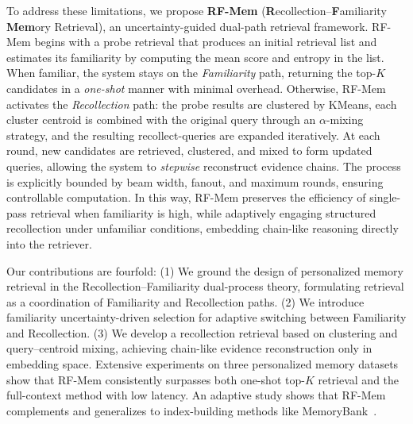 To address these limitations, we propose \textbf{RF-Mem} (\textbf{R}ecollection–\textbf{F}amiliarity \textbf{Mem}ory Retrieval), an uncertainty-guided dual-path retrieval framework. RF-Mem begins with a probe retrieval that produces an initial retrieval list and estimates its familiarity by computing the mean score and entropy in the list. When familiar, the system stays on the \emph{Familiarity} path, returning the top-$K$ candidates in a \textit{one-shot} manner with minimal overhead. Otherwise, RF-Mem activates the \emph{Recollection} path: the probe results are clustered by KMeans, each cluster centroid is combined with the original query through an $\alpha$-mixing strategy, and the resulting recollect-queries are expanded iteratively. At each round, new candidates are retrieved, clustered, and mixed to form updated queries, allowing the system to \textit{stepwise} reconstruct evidence chains. The process is explicitly bounded by beam width, fanout, and maximum rounds, ensuring controllable computation. In this way, RF-Mem preserves the efficiency of single-pass retrieval when familiarity is high, while adaptively engaging structured recollection under unfamiliar conditions, embedding chain-like reasoning directly into the retriever.

Our contributions are fourfold:  
(1) We ground the design of personalized memory retrieval in the Recollection–Familiarity dual-process theory, formulating retrieval as a coordination of Familiarity and Recollection paths.  
(2) We introduce familiarity uncertainty-driven selection for adaptive switching between Familiarity and Recollection.  
(3) We develop a recollection retrieval based on clustering and query–centroid mixing, achieving chain-like evidence reconstruction only in embedding space.  
Extensive experiments on three personalized memory datasets show that RF-Mem consistently surpasses both one-shot top-$K$ retrieval and the full-context method with low latency. An adaptive study shows that RF-Mem complements and generalizes to index-building methods like MemoryBank~\citep{zhong2024memorybank}.


